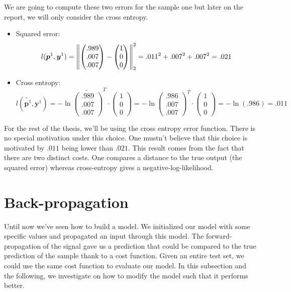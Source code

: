 		\vskip 1cm
		We are going to compute these two errors for the sample one but later on the report, we will only consider the cross entropy.
		\begin{itemize}
			\item Squared error: $$ l(\boldsymbol{p}^1,\boldsymbol{y}^1) =  
									\left\lVert
									\left( \begin{matrix} .989 \\ .007 \\ .007 \end{matrix}\right) - 
									\left( \begin{matrix} 1    \\ 0    \\ 0    \end{matrix}\right) \right\rVert_2^2 = 
									.011^2 + .007^2 + .007^2 = .021 $$
			\item Cross entropy: $$ l(\widetilde{\boldsymbol{p}^1},\boldsymbol{y}^1) = 
									- \ln
								 	\widetilde{\left( \begin{matrix} .989 \\ .007 \\ .007 \end{matrix}\right)}^T \cdot 
									\left( \begin{matrix} 1    \\ 0    \\ 0    \end{matrix}\right) = 
									- \ln
								 	\left( \begin{matrix} .986 \\ .007 \\ .007 \end{matrix}\right)^T \cdot 
									\left( \begin{matrix} 1    \\ 0    \\ 0    \end{matrix}\right) = 
									-\ln(.986) = .011
									$$
		\end{itemize}
		
		For the rest of the thesis, we'll be using the cross entropy error function. There is no special motivation under this choice. One mustn't believe that this choice is motivated by $.011$ being lower than $.021$. This result comes from the fact that there are two distinct costs. One compares a distance to the true output (the squared error) whereas cross-entropy gives a negative-log-likelihood.


	\section{Back-propagation}
	\label{sec:back_propagation}
		Until now we've seen how to build a model. We initialized our model with some specific values and propagated an input through this model. The forward-propagation of the signal gave us a prediction that could be compared to the true prediction of the sample thank to a cost function. Given an entire test set, we could use the same cost function to evaluate our model. In this subsection and the following, we investigate on how to modify the model such that it performs better.

